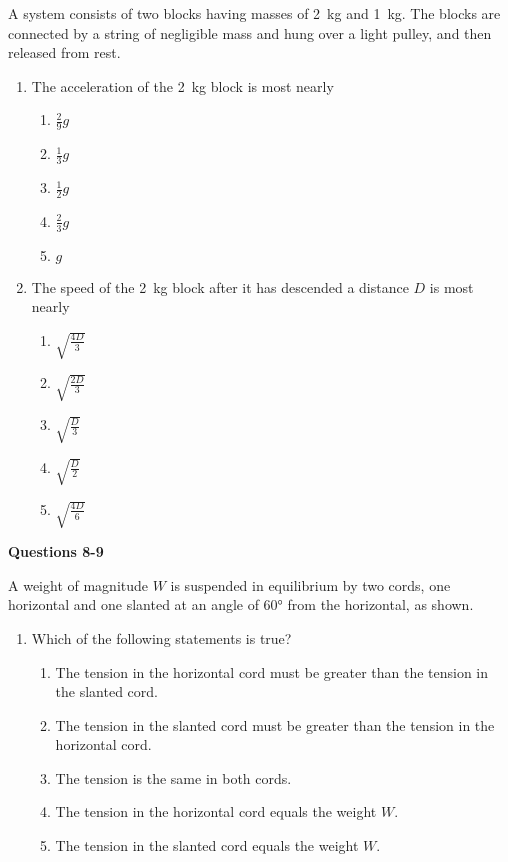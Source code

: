 \documentclass{../../oss-apphys}
\begin{document}
\begin{multicols}{2}
  A system consists of two blocks having masses of \SI{2}{\kilo\gram} and
  \SI{1}{\kilo\gram}. The blocks are connected by a string of negligible mass
  and hung over a light pulley, and then released from rest.
  \begin{center}
  \end{center}
  \begin{enumerate}[resume,leftmargin=18pt]
  \item The acceleration of the \SI{2}{\kilo\gram} block is most nearly
    \begin{enumerate}[noitemsep,topsep=0pt,leftmargin=18pt,label=(\Alph*)]
    \item $\frac{2}{9}g$
    \item $\frac{1}{3}g$
    \item $\frac{1}{2}g$
    \item $\frac{2}{3}g$
    \item $g$
    \end{enumerate}
  \item The speed of the \SI{2}{\kilo\gram} block after it has descended a
    distance $D$ is most nearly
    \begin{enumerate}[noitemsep,topsep=0pt,leftmargin=18pt,label=(\Alph*)]
    \item $\displaystyle\sqrt{\frac{4D}{3}}$
    \item $\displaystyle\sqrt{\frac{2D}{3}}$
    \item $\displaystyle\sqrt{\frac{D}{3}}$
    \item $\displaystyle\sqrt{\frac{D}{2}}$
    \item $\displaystyle\sqrt{\frac{4D}{6}}$
    \end{enumerate}
  \end{enumerate}
  \columnbreak
  
  \textbf{Questions 8-9}

  A weight of magnitude $W$ is suspended in equilibrium by two cords, one
  horizontal and one slanted at an angle of \ang{60} from the horizontal, as
  shown.
  \begin{center}
  \end{center}
  \begin{enumerate}[resume,leftmargin=18pt]
  \item Which of the following statements is true?
    \begin{enumerate}[noitemsep,topsep=0pt,leftmargin=18pt,label=(\Alph*)]
    \item The tension in the horizontal cord must be greater than the tension
      in the slanted cord.
    \item The tension in the slanted cord must be greater than the tension in
      the horizontal cord.
    \item The tension is the same in both cords.
    \item The tension in the horizontal cord equals the weight $W$.
    \item The tension in the slanted cord equals the weight $W$.
    \end{enumerate}


\end{enumerate}
\end{multicols}
\end{document}
